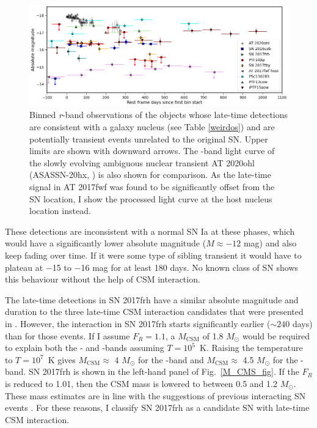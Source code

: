 \documentclass[a4paper,oneside,12pt, class=Latex/Classes/PhDthesisPSnPDF, crop=false]{standalone}
\begin{document}
\begin{figure}
    \centering
    \includegraphics[width=\textwidth]{../Images/chapter_4/ANT_comp.png}
    \caption{Binned \textit{r}-band observations of the objects whose late-time detections are consistent with a galaxy nucleus (see Table \ref{weirdos}) and are potentially transient events unrelated to the original SN. Upper limits are shown with downward arrows. The \ztfr-band light curve of the slowly evolving ambiguous nuclear transient AT 2020ohl (ASASSN-20hx, \citealt{2020ohl_Hinkle}) is also shown for comparison. As the late-time signal in AT 2017fwf was found to be significantly offset from the SN location, I show the processed light curve at the host nucleus location instead.}
    \label{ANT_comp}
\end{figure}

These detections are inconsistent with a normal SN Ia at these phases, which would have a significantly lower absolute magnitude ($M\approx-12$ mag) and also keep fading over time. If it were some type of sibling transient it would have to plateau at $-$15 to $-$16 mag for at least 180 days. No known class of SN shows this behaviour without the help of CSM interaction.

The late-time detections in SN 2017frh have a similar absolute magnitude and duration to the three late-time CSM interaction candidates that were presented in \citet{Terwel_2024_paper1}. However, the interaction in SN 2017frh starts significantly earlier ($\sim240$ days) than for those events. If I assume $F_R = 1.1$, a $M_\text{CSM}$ of 1.8 $M_\odot$ would be required to explain both the \ztfg- and \ztfr-bands assuming $T=10^5$~K. Raising the temperature to $T=10^7$~K gives $M_\text{CSM}\approx$ 4 $M_\odot$ for the \ztfg-band and $M_\text{CSM}\approx$ 4.5 $M_\odot$ for the \ztfr-band. SN 2017frh is shown in the left-hand panel of Fig.~\ref{M_CMS_fig}. If the $F_R$ is reduced to 1.01, then the CSM mass is lowered to between 0.5 and 1.2 $M_\odot$. These mass estimates are in line with the suggestions of previous interacting SN events \citep{ptf11kx, Inserra_2016}. For these reasons, I classify SN 2017frh as a candidate SN with late-time CSM interaction.
\end{document}
